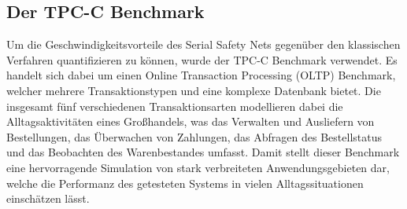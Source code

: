 \subsection{Der TPC-C Benchmark}
Um die Geschwindigkeitsvorteile des Serial Safety Nets gegenüber den klassischen Verfahren quantifizieren zu können, wurde der TPC-C Benchmark verwendet.\cite{tpcc}
Es handelt sich dabei um einen Online Transaction Processing (OLTP) Benchmark, welcher mehrere Transaktionstypen und eine komplexe Datenbank bietet.
Die insgesamt fünf verschiedenen Transaktionsarten modellieren dabei die Alltagsaktivitäten eines Großhandels, was das Verwalten und Ausliefern von Bestellungen, das Überwachen von Zahlungen, das Abfragen des Bestellstatus und das Beobachten des Warenbestandes umfasst.
Damit stellt dieser Benchmark eine hervorragende Simulation von stark verbreiteten Anwendungsgebieten dar, welche die Performanz des getesteten Systems in vielen Alltagssituationen einschätzen lässt.
